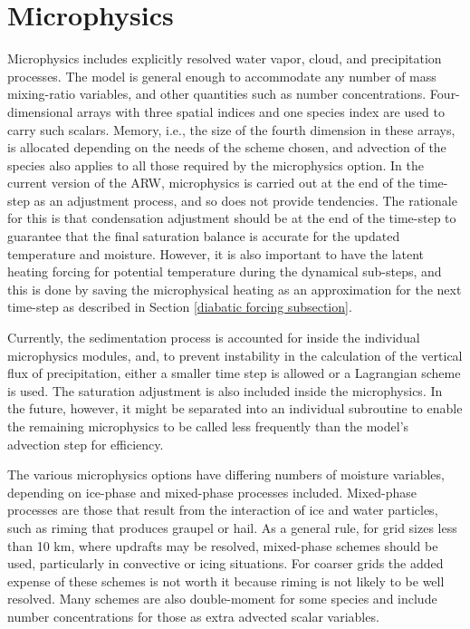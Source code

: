 \section{Microphysics}

Microphysics includes explicitly resolved water vapor, cloud, and 
precipitation processes. The model is general enough to accommodate any 
number of mass mixing-ratio variables, and other quantities
such as number concentrations. Four-dimensional arrays with three spatial
indices and one species index are used to carry such scalars.
Memory, i.e., the size of the fourth dimension in these
arrays, is allocated depending on the needs of the scheme chosen, 
and advection of the species also applies to all those required 
by the microphysics option. In the current version of the ARW, microphysics 
is carried out at the end of the time-step as an adjustment process, 
and so does not provide tendencies. The rationale for this is that 
condensation adjustment should be at the end of the time-step
to guarantee that the final saturation balance is accurate for the 
updated temperature and moisture. However, it is also important to 
have the latent heating forcing for potential temperature during the 
dynamical sub-steps, and this is done by saving the microphysical 
heating as an approximation for the next time-step as described in Section
\ref{diabatic forcing subsection}.

Currently, the sedimentation process is accounted for inside the 
individual microphysics modules, 
and, to prevent instability in the calculation of the vertical flux of
precipitation, either a smaller time step is allowed or a Lagrangian scheme is used. 
The saturation adjustment is also 
included inside the microphysics. In the future, however, it might be separated 
into an individual 
subroutine to enable the remaining microphysics to be called less frequently 
than the model's advection step for efficiency.

The various microphysics options have differing
numbers of moisture variables, depending on ice-phase and mixed-phase
processes included. Mixed-phase processes are those that result from
the interaction of ice and water particles, such as riming that produces
graupel or hail.
As a general rule, for grid sizes less than 10 km, where updrafts may be
resolved, mixed-phase schemes should be used, particularly in convective
or icing situations. For coarser grids the added expense of these schemes
is not worth it because riming is not likely to be well resolved.
Many schemes are also double-moment for some species and include
number concentrations for those as extra advected scalar variables.

